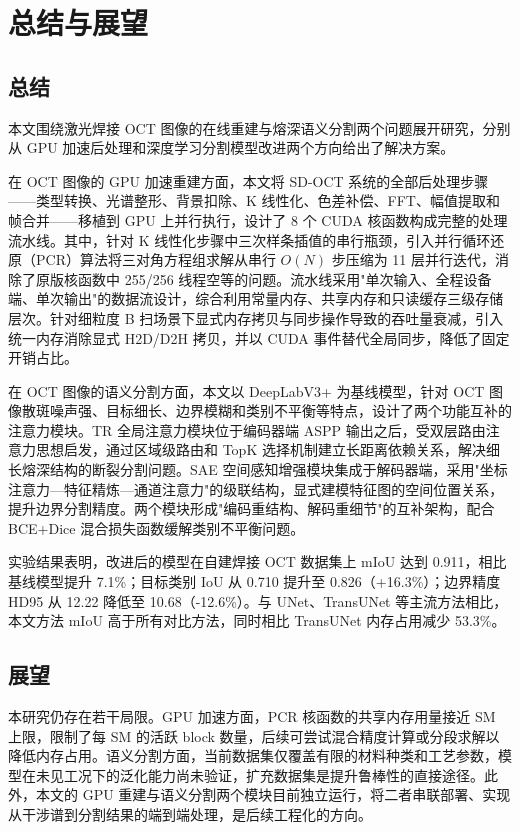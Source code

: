 \clearpage

\section{总结与展望}

\subsection{总结}

本文围绕激光焊接 OCT 图像的在线重建与熔深语义分割两个问题展开研究，分别从 GPU 加速后处理和深度学习分割模型改进两个方向给出了解决方案。

在 OCT 图像的 GPU 加速重建方面，本文将 SD-OCT 系统的全部后处理步骤——类型转换、光谱整形、背景扣除、K 线性化、色差补偿、FFT、幅值提取和帧合并——移植到 GPU 上并行执行，设计了 8 个 CUDA 核函数构成完整的处理流水线。其中，针对 K 线性化步骤中三次样条插值的串行瓶颈，引入并行循环还原（PCR）算法将三对角方程组求解从串行 $O(N)$ 步压缩为 11 层并行迭代，消除了原版核函数中 255/256 线程空等的问题。流水线采用"单次输入、全程设备端、单次输出"的数据流设计，综合利用常量内存、共享内存和只读缓存三级存储层次。针对细粒度 B 扫场景下显式内存拷贝与同步操作导致的吞吐量衰减，引入统一内存消除显式 H2D/D2H 拷贝，并以 CUDA 事件替代全局同步，降低了固定开销占比。

在 OCT 图像的语义分割方面，本文以 DeepLabV3+ 为基线模型，针对 OCT 图像散斑噪声强、目标细长、边界模糊和类别不平衡等特点，设计了两个功能互补的注意力模块。TR 全局注意力模块位于编码器端 ASPP 输出之后，受双层路由注意力思想启发，通过区域级路由和 TopK 选择机制建立长距离依赖关系，解决细长熔深结构的断裂分割问题。SAE 空间感知增强模块集成于解码器端，采用"坐标注意力—特征精炼—通道注意力"的级联结构，显式建模特征图的空间位置关系，提升边界分割精度。两个模块形成"编码重结构、解码重细节"的互补架构，配合 BCE+Dice 混合损失函数缓解类别不平衡问题。

实验结果表明，改进后的模型在自建焊接 OCT 数据集上 mIoU 达到 0.911，相比基线模型提升 7.1\%；目标类别 IoU 从 0.710 提升至 0.826（+16.3\%）；边界精度 HD95 从 12.22 降低至 10.68（-12.6\%）。与 UNet、TransUNet 等主流方法相比，本文方法 mIoU 高于所有对比方法，同时相比 TransUNet 内存占用减少 53.3\%。

\subsection{展望}

本研究仍存在若干局限。GPU 加速方面，PCR 核函数的共享内存用量接近 SM 上限，限制了每 SM 的活跃 block 数量，后续可尝试混合精度计算或分段求解以降低内存占用。语义分割方面，当前数据集仅覆盖有限的材料种类和工艺参数，模型在未见工况下的泛化能力尚未验证，扩充数据集是提升鲁棒性的直接途径。此外，本文的 GPU 重建与语义分割两个模块目前独立运行，将二者串联部署、实现从干涉谱到分割结果的端到端处理，是后续工程化的方向。
